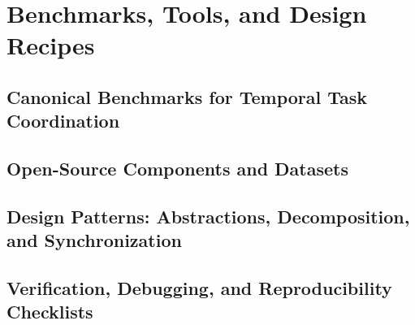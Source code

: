 \chapter{Benchmarks, Tools, and Design Recipes}
\label{chap:benchmarks}


\section{Canonical Benchmarks for Temporal Task Coordination}

\section{Open-Source Components and Datasets}

\section{Design Patterns: Abstractions, Decomposition, and Synchronization}

\section{Verification, Debugging, and Reproducibility Checklists}
